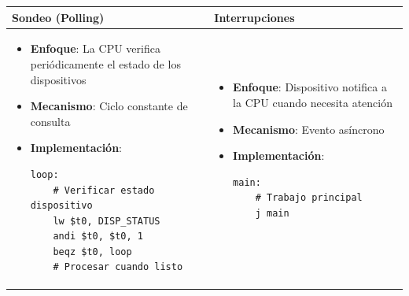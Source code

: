 \documentclass[12pt]{article}
\begin{document}
\begin{table}[h]
\centering
\begin{tabularx}{\textwidth}{|>{\raggedright\arraybackslash}X|>{\raggedright\arraybackslash}X|}
\hline
\textbf{Sondeo (Polling)} & \textbf{Interrupciones} \\
\hline
\hline
\begin{minipage}[t]{0.45\textwidth}
\vspace{-\baselineskip}
\begin{itemize}[leftmargin=*,noitemsep]
    \item \textbf{Enfoque}: La CPU verifica periódicamente el estado de los dispositivos
    \item \textbf{Mecanismo}: Ciclo constante de consulta
    \item \textbf{Implementación}:
    \begin{lstlisting}
loop:
    # Verificar estado dispositivo
    lw $t0, DISP_STATUS
    andi $t0, $t0, 1
    beqz $t0, loop
    # Procesar cuando listo
    \end{lstlisting}
\end{itemize}
\end{minipage} & 
\begin{minipage}[t]{0.45\textwidth}
\vspace{-\baselineskip}
\begin{itemize}[leftmargin=*,noitemsep]
    \item \textbf{Enfoque}: Dispositivo notifica a la CPU cuando necesita atención
    \item \textbf{Mecanismo}: Evento asíncrono
    \item \textbf{Implementación}:
    \begin{lstlisting}
main:
    # Trabajo principal
    j main


\end{lstlisting}
\end{itemize}
\end{minipage}
\end{tabularx}
\end{table}
\end{document}
